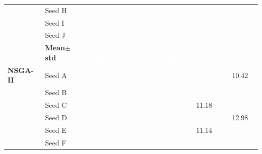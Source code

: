\begin{table}[H]
{\begin{tabular}{@{}llccccc@{}}
 & Seed H & \cellcolor{RoyalBlue!10}{\small 1.88} & \cellcolor{RoyalBlue!10}{\small 2.64} & \cellcolor{RoyalBlue!10}{\small 2.68} & \cellcolor{RoyalBlue!10}{\small 3.30} & \cellcolor{RoyalBlue!10}{\small 4.03} \\
 & Seed I & \cellcolor{RoyalBlue!10}{\small 2.26} & \cellcolor{RoyalBlue!10}{\small 2.75} & \cellcolor{RoyalBlue!10}{\small 3.33} & \cellcolor{RoyalBlue!10}{\small 2.86} & \cellcolor{RoyalBlue!10}{\small 4.09} \\
 & Seed J & \cellcolor{RoyalBlue!10}{\small 1.92} & \cellcolor{RoyalBlue!10}{\small 2.93} & \cellcolor{RoyalBlue!10}{\small 3.45} & \cellcolor{RoyalBlue!10}{\small 3.25} & \cellcolor{RoyalBlue!10}{\small 3.77} \\
 & \textbf{Mean$\pm$std} & \cellcolor{RoyalBlue!65}\textcolor{white}{\textbf{2.12$\pm$0.23}} & \cellcolor{RoyalBlue!65}\textcolor{white}{\textbf{2.81$\pm$0.30}} & \cellcolor{RoyalBlue!65}\textcolor{white}{\textbf{3.19$\pm$0.57}} & \cellcolor{RoyalBlue!65}\textcolor{white}{\textbf{3.69$\pm$0.84}} & \cellcolor{RoyalBlue!65}\textcolor{white}{\textbf{4.03$\pm$0.66}} \\
\midrule
\textbf{NSGA-II} & Seed A & \cellcolor{RoyalBlue!10}{\small 2.52} & \cellcolor{RoyalBlue!10}{\small 3.91} & \cellcolor{RoyalBlue!10}{\small 5.34} & \cellcolor{RoyalBlue!10}{\small 7.41} & {\small\color{gray!60!black}10.42} \\
 & Seed B & \cellcolor{RoyalBlue!10}{\small 4.18} & \cellcolor{RoyalBlue!10}{\small 6.67} & \cellcolor{RoyalBlue!10}{\small 7.92} & \cellcolor{RoyalBlue!10}{\small 6.67} & \cellcolor{RoyalBlue!10}{\small 9.48} \\
 & Seed C & \cellcolor{RoyalBlue!10}{\small 2.99} & \cellcolor{RoyalBlue!10}{\small 5.13} & \cellcolor{RoyalBlue!10}{\small 6.15} & {\small\color{gray!60!black}11.18} & \cellcolor{RoyalBlue!10}{\small 8.53} \\
 & Seed D & \cellcolor{RoyalBlue!10}{\small 3.82} & \cellcolor{RoyalBlue!10}{\small 4.98} & \cellcolor{RoyalBlue!10}{\small 8.75} & \cellcolor{RoyalBlue!10}{\small 8.05} & {\small\color{gray!60!black}12.98} \\
 & Seed E & \cellcolor{RoyalBlue!10}{\small 3.78} & \cellcolor{RoyalBlue!10}{\small 6.15} & \cellcolor{RoyalBlue!10}{\small 6.63} & {\small\color{gray!60!black}11.14} & \cellcolor{RoyalBlue!10}{\small 8.58} \\
 & Seed F & \cellcolor{RoyalBlue!10}{\small 3.61} & \cellcolor{RoyalBlue!10}{\small 5.82} & \cellcolor{RoyalBlue!10}{\small 6.82} & \cellcolor{RoyalBlue!10}{\small 9.28} & \cellcolor{RoyalBlue!10}{\small 9.65} \\

\end{tabular}}
\end{table}
